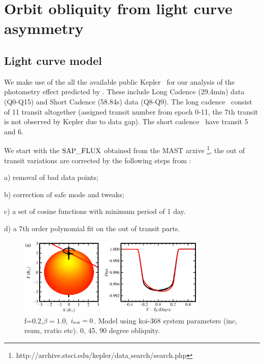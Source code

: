 \documentclass[preprint]{emulateapj}
\begin{document}

\section{Orbit obliquity from light curve asymmetry}
\label{sec:transit-light-curve}

\subsection{Light curve model}
\label{sec:lightcurve-model}

We make use of the all the available public Kepler \lcs\ for our analysis 
of the photometry effect predicted by \citet{Barnes:2009}. These include 
Long Cadence (29.4min) data (Q0-Q15) and Short Cadence (58.84s) data (Q8-Q9). 
The long cadence \lcs\ consist of 11 transit altogether (assigned 
transit number from epoch 0-11, the 7th transit is not observed by Kepler 
due to data gap). The short cadence \lcs\ have transit 5 and 6. 

We start with the $\rm SAP\_FLUX$ obtained from the MAST arxive  
\footnote{http://archive.stsci.edu/kepler/data$\_$search/search.php}, the out 
of transit variations are corrected by the following steps from 
\citet{Huang:2013}:

a) removal of bad data points;

b) correction of safe mode and tweaks;

c) a set of cosine functions with minimum period of 1 day. 

d) a 7th order polynomial fit on the out of transit parts. 
\begin{figure}
  \centering
  \includegraphics[width=9cm]{obliq_model.eps}
  \caption{f=0.2,$\beta=1.0$, $i_{\rm rot}=0$. Model using koi-368 system
    parameters (inc, rsum, rratio etc). 0, 45, 90 degree obliquity.}
  \label{fig:obliqmodel}
\end{figure}
\end{document}
